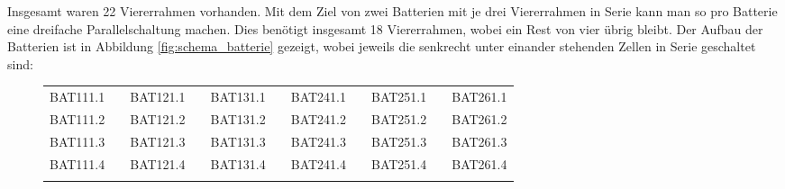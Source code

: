 Insgesamt waren 22 Viererrahmen vorhanden. Mit dem Ziel von zwei Batterien mit je drei Viererrahmen in Serie kann man so pro Batterie eine dreifache Parallelschaltung machen. Dies benötigt insgesamt 18 Viererrahmen, wobei ein Rest von vier übrig bleibt. Der Aufbau der Batterien ist in Abbildung \ref{fig:schema_batterie} gezeigt, wobei jeweils die senkrecht unter einander stehenden Zellen in Serie geschaltet sind:

\begin{figure}[h]
	\centering
	\footnotesize
\begin{tabular}{lp{2mm}lp{2mm}lp{1.5cm}lp{2mm}lp{2mm}l}
\cline{1-1} \cline{3-3} \cline{5-5} \cline{7-7} \cline{9-9} \cline{11-11}
\multicolumn{1}{|l|}{BAT111.1} & \multicolumn{1}{l|}{} & \multicolumn{1}{l|}{BAT121.1} & \multicolumn{1}{l|}{} & \multicolumn{1}{l|}{BAT131.1} & \multicolumn{1}{l|}{} & \multicolumn{1}{l|}{BAT241.1} & \multicolumn{1}{l|}{} & \multicolumn{1}{l|}{BAT251.1} & \multicolumn{1}{l|}{} & \multicolumn{1}{l|}{BAT261.1} \\ \cline{1-1} \cline{3-3} \cline{5-5} \cline{7-7} \cline{9-9} \cline{11-11} 
\multicolumn{1}{|l|}{BAT111.2} & \multicolumn{1}{l|}{} & \multicolumn{1}{l|}{BAT121.2} & \multicolumn{1}{l|}{} & \multicolumn{1}{l|}{BAT131.2} & \multicolumn{1}{l|}{} & \multicolumn{1}{l|}{BAT241.2} & \multicolumn{1}{l|}{} & \multicolumn{1}{l|}{BAT251.2} & \multicolumn{1}{l|}{} & \multicolumn{1}{l|}{BAT261.2} \\ \cline{1-1} \cline{3-3} \cline{5-5} \cline{7-7} \cline{9-9} \cline{11-11} 
\multicolumn{1}{|l|}{BAT111.3} & \multicolumn{1}{l|}{} & \multicolumn{1}{l|}{BAT121.3} & \multicolumn{1}{l|}{} & \multicolumn{1}{l|}{BAT131.3} & \multicolumn{1}{l|}{} & \multicolumn{1}{l|}{BAT241.3} & \multicolumn{1}{l|}{} & \multicolumn{1}{l|}{BAT251.3} & \multicolumn{1}{l|}{} & \multicolumn{1}{l|}{BAT261.3} \\ \cline{1-1} \cline{3-3} \cline{5-5} \cline{7-7} \cline{9-9} \cline{11-11} 
\multicolumn{1}{|l|}{BAT111.4} & \multicolumn{1}{l|}{} & \multicolumn{1}{l|}{BAT121.4} & \multicolumn{1}{l|}{} & \multicolumn{1}{l|}{BAT131.4} & \multicolumn{1}{l|}{} & \multicolumn{1}{l|}{BAT241.4} & \multicolumn{1}{l|}{} & \multicolumn{1}{l|}{BAT251.4} & \multicolumn{1}{l|}{} & \multicolumn{1}{l|}{BAT261.4} \\ \cline{1-1} \cline{3-3} \cline{5-5} \cline{7-7} \cline{9-9} \cline{11-11} 
                               &                       &                               &                       &                               &                       &                               &                       &                               &                       &                               \\ \cline{1-1} \cline{3-3} \cline{5-5} \cline{7-7} \cline{9-9} \cline{11-11} 

\end{tabular}
\end{figure}
